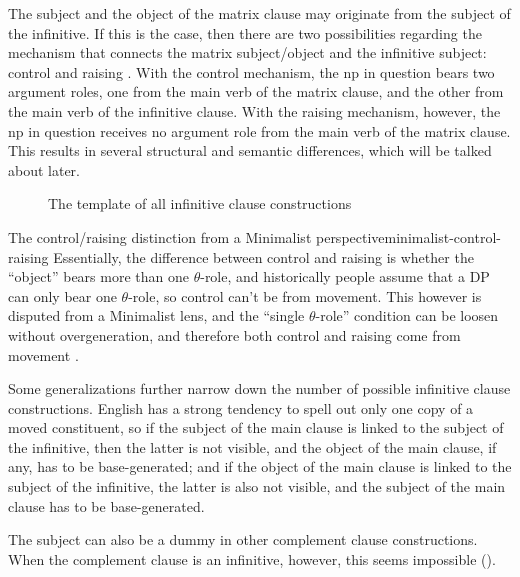 \documentclass[UTF8, a4paper, oneside, scheme=plain]{ctexrep}
\newcommand*{\citepages}[1]{pp.~{#1}}
\begin{document}
The subject and the object of the matrix clause may originate from the subject of the infinitive.
If this is the case,
then there are two possibilities regarding the mechanism that connects the matrix subject/object 
and the infinitive subject:
control and raising \citet[\citepages{1194-1197}]{cgel}.
With the control mechanism,
the \acs{np} in question bears two argument roles,
one from the main verb of the matrix clause, and the other from the main verb of the infinitive clause.
With the raising mechanism, however,
the \acs{np} in question receives no argument role from the main verb of the matrix clause.
This results in several structural and semantic differences,
which will be talked about later.

\begin{figure}
    \centering
    
    \caption{The template of all infinitive clause constructions}
    \label{fig:complement.infinitive.template}
\end{figure}

\begin{theorybox}{The control/raising distinction from a Minimalist perspective}{minimalist-control-raising}
    Essentially, the difference between control and raising is 
    whether the ``object'' bears more than one $\theta$-role,
    and historically people assume that a DP can only bear one $\theta$-role,
    so control can't be from movement.
    This however is disputed from a Minimalist lens,
    and the ``single $\theta$-role'' condition 
    can be loosen without overgeneration,
    and therefore both control and raising come from movement
    \citet{hornstein1999movement}. 
\end{theorybox}

Some generalizations further narrow down 
the number of possible infinitive clause constructions.
English has a strong tendency to spell out only one copy of a moved constituent,
so if the subject of the main clause is linked to the subject of the infinitive,
then the latter is not visible,
and the object of the main clause, if any, has to be base-generated;
and if the object of the main clause is linked to the subject of the infinitive,
the latter is also not visible,
and the subject of the main clause has to be base-generated.

The subject can also be a dummy in other complement clause constructions.
When the complement clause is an infinitive, however, 
this seems impossible ().
\end{document}
